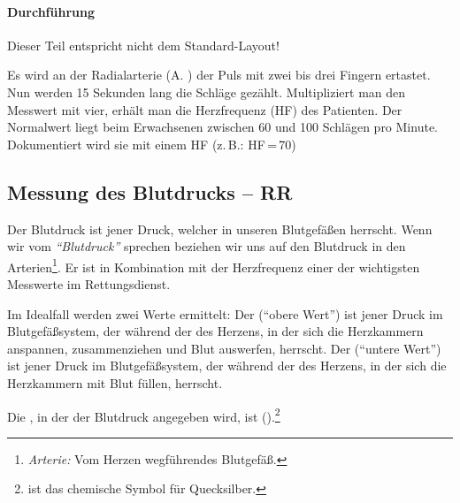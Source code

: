 \paragraph{Durchführung}
{Dieser Teil entspricht nicht dem Standard-Layout!}

Es wird an der Radialarterie (A. ) der Puls mit
zwei bis drei Fingern ertastet. Nun werden 15 Sekunden lang
die Schläge gezählt. Multipliziert man den Messwert mit vier, erhält man  die Herzfrequenz (HF) des Patienten. Der Normalwert liegt beim Erwachsenen zwischen 60 und 100 Schlägen pro Minute.
Dokumentiert wird sie mit einem HF (z.\,B.: HF\,=\,70)

\subsection{Messung des Blutdrucks -- RR}
\label{topic:blutdruckmessung}

Der Blutdruck ist jener Druck, welcher in unseren Blutgefäßen
herrscht. Wenn wir vom \emph{"`Blutdruck"'} sprechen beziehen wir
uns auf den Blutdruck in den
Arterien\footnote{\emph{Arterie:} Vom Herzen wegführendes
Blutgefäß.}. Er ist in Kombination mit der Herzfrequenz
einer der wichtigsten Messwerte im
Rettungsdienst.

Im Idealfall werden zwei Werte ermittelt: Der
 ("`obere Wert"') ist jener Druck im
Blutgefäßsystem, der  während der  des Herzens, in der sich
die Herzkammern anspannen, zusammenziehen und Blut auswerfen, herrscht. Der
 ("`untere Wert"') ist jener Druck im
Blutgefäßsystem, der während der  des Herzens,
in der sich die Herzkammern mit
Blut füllen, herrscht. 

Die , in der der Blutdruck angegeben wird, ist
().\footnote{
ist das chemische Symbol für Quecksilber.}

